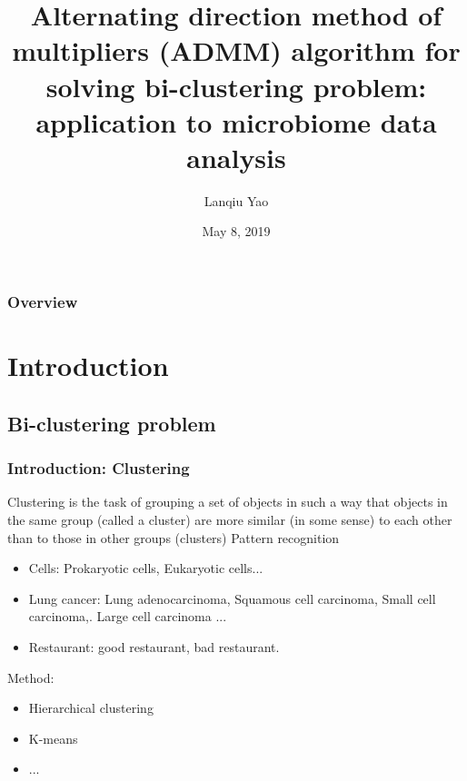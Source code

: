 \documentclass{beamer}
\title[ADMM]{Alternating direction method of multipliers (ADMM) algorithm for solving bi-clustering problem: application to microbiome data analysis}
\author{Lanqiu Yao}
\institute[NYU] 
{
NYU School of Medicine \\
Division of Biostatistics\\ 
\medskip
\textit{ly1192@nyu.edu} 
}
\date{May 8, 2019}
\begin{document}
\begin{frame}
\titlepage 
\end{frame}

\begin{frame}
\frametitle{Overview} 
\tableofcontents 
\end{frame}

\section{Introduction}
\subsection{Bi-clustering problem}

\begin{frame}
\frametitle{Introduction: Clustering}

Clustering is the task of grouping a set of objects in such a way that objects in the same group (called a cluster) are more similar (in some sense) to each other than to those in other groups (clusters)
\vfill
Pattern recognition
\begin{itemize}
    \item Cells: Prokaryotic cells, Eukaryotic cells...
    \item Lung cancer: Lung adenocarcinoma, Squamous cell carcinoma, Small cell carcinoma,. Large cell carcinoma ...
    \item Restaurant: good restaurant, bad restaurant. 
\end{itemize}

Method: 
\begin{itemize}
    \item Hierarchical clustering
    \item K-means
    \item ...
\end{itemize}

\end{frame}
\end{document}
